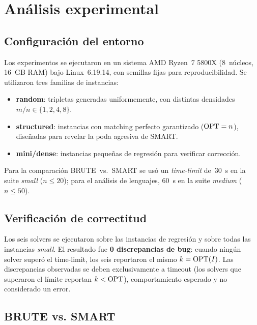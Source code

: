 \section{Análisis experimental}
\label{sec:experimentos}

\subsection{Configuración del entorno}
\label{sec:exp:config}

Los experimentos se ejecutaron en un sistema AMD Ryzen~7 5800X (8~núcleos,
16~GB RAM) bajo Linux~6.19.14, con semillas fijas para reproducibilidad.
Se utilizaron tres familias de instancias:
\begin{itemize}
  \item \textbf{random}: tripletas generadas uniformemente, con distintas
        densidades $m/n\in\{1,2,4,8\}$.
  \item \textbf{structured}: instancias con matching perfecto garantizado
        ($\operatorname{OPT}=n$), diseñadas para revelar la poda agresiva de SMART.
  \item \textbf{mini/dense}: instancias pequeñas de regresión para verificar
        corrección.
\end{itemize}
Para la comparación BRUTE~vs.~SMART se usó un \textit{time-limit} de~30~s
en la suite \textit{small} ($n\le 20$); para el análisis de lenguajes, 60~s
en la suite \textit{medium} ($n\le 50$).

\subsection{Verificación de correctitud}
\label{sec:exp:correctitud}

Los seis solvers se ejecutaron sobre las instancias de regresión y sobre todas
las instancias \textit{small}.
El resultado fue \textbf{0 discrepancias de bug}: cuando ningún solver
superó el time-limit, los seis reportaron el mismo $k=\operatorname{OPT}(I)$.
Las discrepancias observadas se deben exclusivamente a timeout (los solvers
que superaron el límite reportan $k<\operatorname{OPT}$), comportamiento esperado y no
considerado un error.

\begin{center}

\end{center}

\subsection{BRUTE vs. SMART}
\label{sec:exp:brute_vs_smart}

